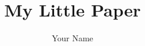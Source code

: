 \documentclass{sig-alternate}
\begin{document}
\title{My Little Paper}


\author {
 \alignauthor
 Your Name\\
        \\
 }


\maketitle





%
%

\balancecolumns
\end{document}
